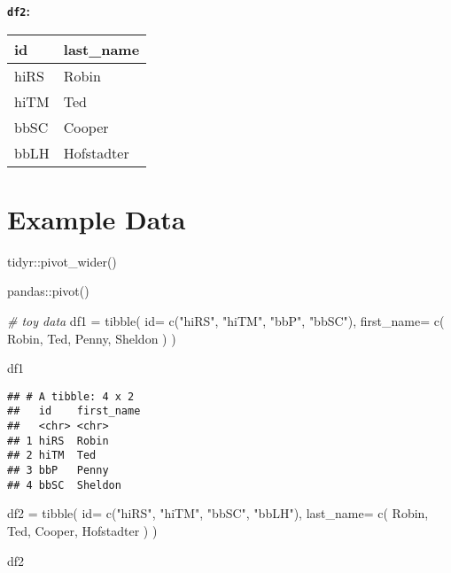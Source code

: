 \documentclass[
]{book}
\newenvironment{Shaded}{\begin{snugshade}}{\end{snugshade}}
\newcommand{\CommentTok}[1]{\textcolor[rgb]{0.56,0.35,0.01}{\textit{#1}}}
\newcommand{\FunctionTok}[1]{\textcolor[rgb]{0.00,0.00,0.00}{#1}}
\newcommand{\NormalTok}[1]{#1}
\newcommand{\OtherTok}[1]{\textcolor[rgb]{0.56,0.35,0.01}{#1}}
\newcommand{\StringTok}[1]{\textcolor[rgb]{0.31,0.60,0.02}{#1}}
\begin{document}
\textbf{\texttt{df2}:}

\begin{longtable}[]{@{}ll@{}}
\toprule
id & last\_name \\
\midrule
\endhead
hiRS & Robin \\
hiTM & Ted \\
bbSC & Cooper \\
bbLH & Hofstadter \\
\bottomrule
\end{longtable}

\hypertarget{example-data}{%
\section{Example Data}\label{example-data}}

tidyr::pivot\_wider()

pandas::pivot()

\begin{Shaded}
\begin{Highlighting}[]
\CommentTok{\# toy data}
\NormalTok{df1 }\OtherTok{=} \FunctionTok{tibble}\NormalTok{(}
    \StringTok{\textquotesingle{}id\textquotesingle{}}\OtherTok{=} \FunctionTok{c}\NormalTok{(}\StringTok{"hiRS"}\NormalTok{, }\StringTok{"hiTM"}\NormalTok{,}
           \StringTok{"bbP"}\NormalTok{, }\StringTok{"bbSC"}\NormalTok{),}
    \StringTok{\textquotesingle{}first\_name\textquotesingle{}}\OtherTok{=} \FunctionTok{c}\NormalTok{(}
        \StringTok{\textquotesingle{}Robin\textquotesingle{}}\NormalTok{,}
        \StringTok{\textquotesingle{}Ted\textquotesingle{}}\NormalTok{,}
        \StringTok{\textquotesingle{}Penny\textquotesingle{}}\NormalTok{,}
        \StringTok{\textquotesingle{}Sheldon\textquotesingle{}}
\NormalTok{    )}
\NormalTok{)}

\NormalTok{df1}
\end{Highlighting}
\end{Shaded}

\begin{verbatim}
## # A tibble: 4 x 2
##   id    first_name
##   <chr> <chr>     
## 1 hiRS  Robin     
## 2 hiTM  Ted       
## 3 bbP   Penny     
## 4 bbSC  Sheldon
\end{verbatim}

\begin{Shaded}
\begin{Highlighting}[]
\NormalTok{df2 }\OtherTok{=} \FunctionTok{tibble}\NormalTok{(}
    \StringTok{\textquotesingle{}id\textquotesingle{}}\OtherTok{=} \FunctionTok{c}\NormalTok{(}\StringTok{"hiRS"}\NormalTok{, }\StringTok{"hiTM"}\NormalTok{,}
            \StringTok{"bbSC"}\NormalTok{, }\StringTok{"bbLH"}\NormalTok{),}
    \StringTok{\textquotesingle{}last\_name\textquotesingle{}}\OtherTok{=} \FunctionTok{c}\NormalTok{(}
        \StringTok{\textquotesingle{}Robin\textquotesingle{}}\NormalTok{,}
        \StringTok{\textquotesingle{}Ted\textquotesingle{}}\NormalTok{,}
        \StringTok{\textquotesingle{}Cooper\textquotesingle{}}\NormalTok{,}
        \StringTok{\textquotesingle{}Hofstadter\textquotesingle{}}
\NormalTok{    )}
\NormalTok{)}

\NormalTok{df2}
\end{Highlighting}
\end{Shaded}
\end{document}
